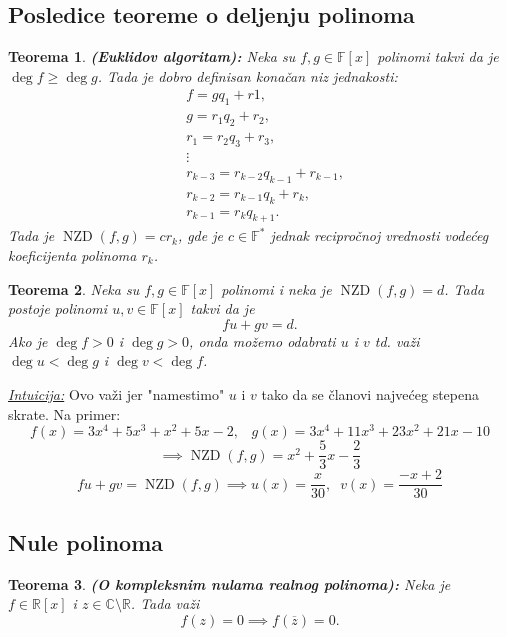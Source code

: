 \documentclass[a4paper,12pt,twoside]{report}
\newtheorem{theorem}{Teorema}[section]
\numberwithin{algorithm}{section}
\begin{document}
\subsection{Posledice teoreme o deljenju polinoma}

\begin{theorem}
    \textbf{(Euklidov algoritam):} Neka su $f, g \in \mathbb{F}[x]$ polinomi takvi da je  $\deg f \geq \deg g$. Tada je dobro
    definisan konačan niz jednakosti:
    \[
        \begin{aligned}
            &f = gq_1 + r1,\\
            &g = r_1q_2 + r_2, \\
            &r_1 = r_2q_3 + r_3, \\
            &\vdots\\
            &r_{k-3} = r_{k-2}q_{k-1} + r_{k-1},\\
            &r_{k-2} = r_{k-1}q_k + r_k,\\
            &r_{k-1} = r_kq_{k+1}.
        \end{aligned}
    \]
    Tada je $\operatorname{NZD}(f, g)=cr_k$, gde je $c \in \mathbb{F}^*$ jednak recipročnoj vrednosti vodećeg koeficijenta
    polinoma $r_k$.
\end{theorem}

\begin{theorem}
    Neka su $f, g \in \mathbb{F}[x]$ polinomi i neka je $\operatorname{NZD}(f,g)=d$. Tada postoje polinomi $u, v \in \mathbb{F}[x]$
    takvi da je
    \[ fu + gv = d. \]
    Ako je $\deg f > 0$ i $\deg g > 0$, onda možemo odabrati $u$ i $v$ td. važi $\deg u < \deg g$ i $\deg v < \deg f$.
\end{theorem}
\noindent\underline{\textit{Intuicija:}} Ovo važi jer "namestimo" $u$ i $v$ tako da se članovi najvećeg stepena skrate. Na primer:
\[ f(x) = 3x^4 + 5x^3 + x^2 + 5x - 2, \;\;\; g(x) = 3x^4 + 11x^3 + 23x^2 + 21x - 10 \]
\[ \implies \operatorname{NZD}(f, g) = x^2 + \frac{5}{3}x - \frac{2}{3} \]
\[ fu + gv = \operatorname{NZD}(f, g) \implies u(x) = \frac{x}{30}, \;\; v(x) = \frac{-x + 2}{30} \]

\subsection{Nule polinoma}

\begin{theorem}
    \textbf{(O kompleksnim nulama realnog polinoma):} Neka je $f \in \mathbb{R}[x]$ i $z \in \mathbb{C}\setminus\mathbb{R}$. Tada važi
    \[ f(z) = 0 \implies f(\overline{z}) = 0. \]
\end{theorem}
\end{document}
